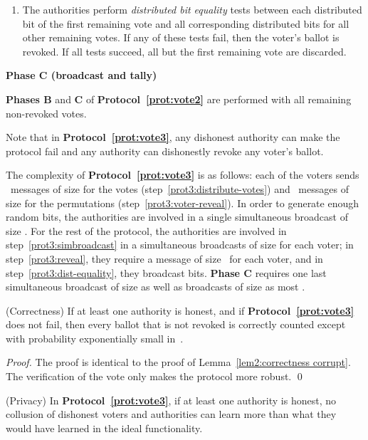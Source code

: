 \documentclass[runningheads]{llncs}
\begin{document}
\begin{protocol}[h]
\begin{enumerate}
\item \label{prot3:dist-equality}The authorities perform \emph{distributed bit equality} tests between each
distributed bit of the first remaining vote and all corresponding
distributed bits for all other remaining votes. If any of these
tests fail, then the voter's ballot is revoked. If all tests
succeed, all but the first remaining vote are discarded.
\end{enumerate}
 \vspace{-.25cm}
\textbf{Phase C (broadcast and tally)}

\textbf{Phases B} and \textbf{C} of
\textbf{Protocol~\ref{prot:vote2}} are performed with  all remaining
non-revoked votes.

\end{protocol}

Note that in \textbf{Protocol~\ref{prot:vote3}}, any dishonest
authority can make the protocol fail and any authority can
dishonestly revoke any voter's ballot.

The complexity of \textbf{Protocol~\ref{prot:vote3}} is as follows:
each of the  voters sends ~messages of size   for
the votes (step~\ref{prot3:distribute-votes}) and ~messages of
size  for the permutations
(step~\ref{prot3:voter-reveal}). In order to generate enough random
bits, the authorities are involved in a single simultaneous
broadcast of size . For the rest of
the protocol, the  authorities are involved in
step~\ref{prot3:simbroadcast} in a simultaneous broadcasts of size
 for each voter; in step~\ref{prot3:reveal}, they require
a message of size~ for each voter, and in
step~\ref{prot3:dist-equality}, they broadcast  bits.
\textbf{Phase C} requires one last simultaneous broadcast of size  as well as  broadcasts of size as most .


\begin{lemma}(Correctness) \label{lem3:correctness corrupt}
If at least one authority is
honest, and if \textbf{Protocol~\ref{prot:vote3}} does not fail,
then every ballot that is not revoked is correctly counted except
with probability exponentially small in~.
\end{lemma}


\begin{proof}
The proof is  identical to the proof of Lemma~\ref{lem2:correctness
corrupt}.
The verification of the vote only makes the protocol more
robust. \qed
\end{proof}


\begin{lemma}(Privacy)
\label{lem3:privacy} In \textbf{Protocol~\ref{prot:vote3}}, if at
least one authority is honest, no collusion of dishonest voters and
authorities can learn more than what they would have learned in the
ideal functionality.
\end{lemma}
\end{document}
